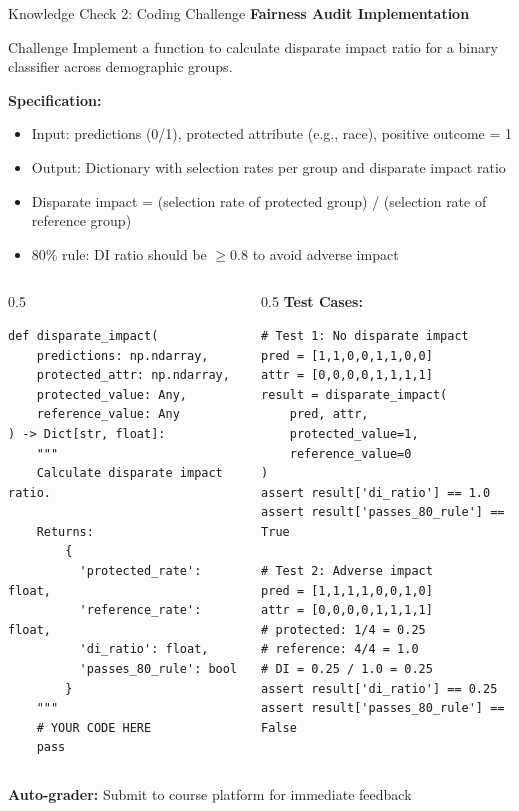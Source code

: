 \begin{frame}[fragile]{Knowledge Check 2: Coding Challenge}
\textbf{Fairness Audit Implementation}

\vspace{0.3cm}

\begin{block}{Challenge}
Implement a function to calculate disparate impact ratio for a binary classifier across demographic groups.

\textbf{Specification:}
\begin{itemize}
\item Input: predictions (0/1), protected attribute (e.g., race), positive outcome = 1
\item Output: Dictionary with selection rates per group and disparate impact ratio
\item Disparate impact = (selection rate of protected group) / (selection rate of reference group)
\item 80\% rule: DI ratio should be $\geq 0.8$ to avoid adverse impact
\end{itemize}
\end{block}

\vspace{0.2cm}

\begin{columns}
\begin{column}{0.5\textwidth}
\small
\begin{verbatim}
def disparate_impact(
    predictions: np.ndarray,
    protected_attr: np.ndarray,
    protected_value: Any,
    reference_value: Any
) -> Dict[str, float]:
    """
    Calculate disparate impact ratio.

    Returns:
        {
          'protected_rate': float,
          'reference_rate': float,
          'di_ratio': float,
          'passes_80_rule': bool
        }
    """
    # YOUR CODE HERE
    pass
\end{verbatim}
\end{column}

\begin{column}{0.5\textwidth}
\textbf{Test Cases:}
\small
\begin{verbatim}
# Test 1: No disparate impact
pred = [1,1,0,0,1,1,0,0]
attr = [0,0,0,0,1,1,1,1]
result = disparate_impact(
    pred, attr,
    protected_value=1,
    reference_value=0
)
assert result['di_ratio'] == 1.0
assert result['passes_80_rule'] == True

# Test 2: Adverse impact
pred = [1,1,1,1,0,0,1,0]
attr = [0,0,0,0,1,1,1,1]
# protected: 1/4 = 0.25
# reference: 4/4 = 1.0
# DI = 0.25 / 1.0 = 0.25
assert result['di_ratio'] == 0.25
assert result['passes_80_rule'] == False
\end{verbatim}
\end{column}
\end{columns}

\vspace{0.2cm}
\textbf{Auto-grader:} Submit to course platform for immediate feedback
\end{frame}

